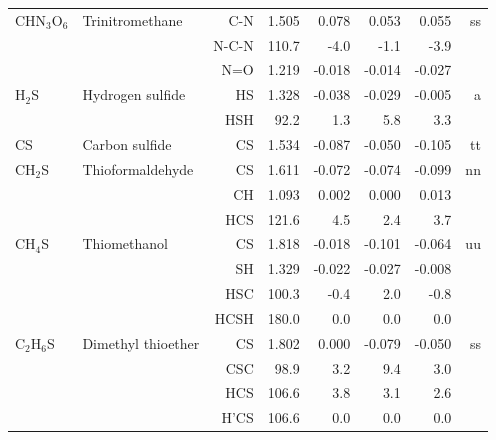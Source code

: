\begin{table}
\begin{center}
\begin{tabular}{llrrrrrr}
 CHN$_3$O$_6$      & Trinitromethane                    &C-N           &     1.505   &     0.078 &     0.053 &     0.055 &    ss \\
             &                                    &N-C-N       &     110.7   &      -4.0 &      -1.1 &      -3.9   &       \\
             &                                    &N=O           &     1.219   &    -0.018 &    -0.014 &    -0.027 &       \\
 H$_2$S         & Hydrogen sulfide                   &HS            &     1.328   &    -0.038 &    -0.029 &    -0.005 &     a \\
             &                                    &HSH         &      92.2   &       1.3 &       5.8 &       3.3   &       \\
 CS          & Carbon sulfide                     &CS            &     1.534   &    -0.087 &    -0.050 &    -0.105 &    tt \\
 CH$_2$S        & Thioformaldehyde                   &CS            &     1.611   &    -0.072 &    -0.074 &    -0.099 &    nn \\
             &                                    &CH            &     1.093   &     0.002 &     0.000 &     0.013 &       \\
             &                                    &HCS         &     121.6   &       4.5 &       2.4 &       3.7   &       \\
 CH$_4$S        & Thiomethanol                       &CS            &     1.818   &    -0.018 &    -0.101 &    -0.064 &    uu \\
             &                                    &SH            &     1.329   &    -0.022 &    -0.027 &    -0.008 &       \\
             &                                    &HSC         &     100.3   &      -0.4 &       2.0 &      -0.8   &       \\
             &                                    &HCSH        &     180.0   &       0.0 &       0.0 &       0.0   &       \\
 C$_2$H$_6$S       & Dimethyl thioether                 &CS            &     1.802   &     0.000 &    -0.079 &    -0.050 &    ss \\
             &                                    &CSC         &      98.9   &       3.2 &       9.4 &       3.0   &       \\
             &                                    &HCS         &     106.6   &       3.8 &       3.1 &       2.6   &       \\
             &                                    &H'CS        &     106.6   &       0.0 &       0.0 &       0.0   &       \\
\hline
\end{tabular}
\end{center}
\end{table}
\clearpage


